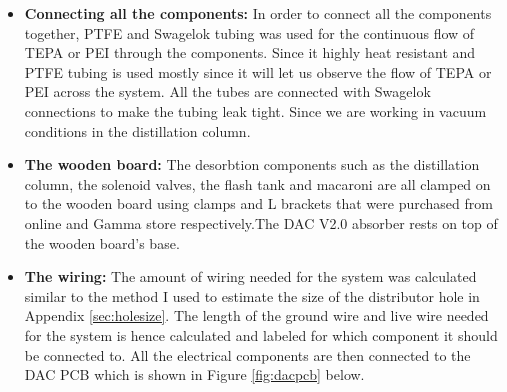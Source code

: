 \begin{itemize}
    \item \textbf{Connecting all the components: }In order to connect all the components together, PTFE and Swagelok tubing was used for the continuous flow of TEPA or PEI through the components. Since it highly heat resistant and PTFE tubing is used mostly since it will let us observe the flow of TEPA or PEI across the system. All the tubes are connected with Swagelok connections to make the tubing leak tight. Since we are working in vacuum conditions in the distillation column. 
    
    \item \textbf{The wooden board: }The desorbtion components such as the distillation column, the solenoid valves, the flash tank and macaroni are all clamped on to the wooden board using clamps and L brackets that were purchased from online and Gamma store respectively.The DAC V2.0 absorber rests on top of the wooden board's base.
    
    \item \textbf{The wiring: }The amount of wiring needed for the system was calculated similar to the method I used to estimate the size of the distributor hole in Appendix \ref{sec:holesize}. The length of the ground wire and live wire needed for the system is hence calculated and labeled for which component it should be connected to. All the electrical components are then connected to the DAC PCB which is shown in Figure \ref{fig:dacpcb} below. 
    

\end{itemize}
